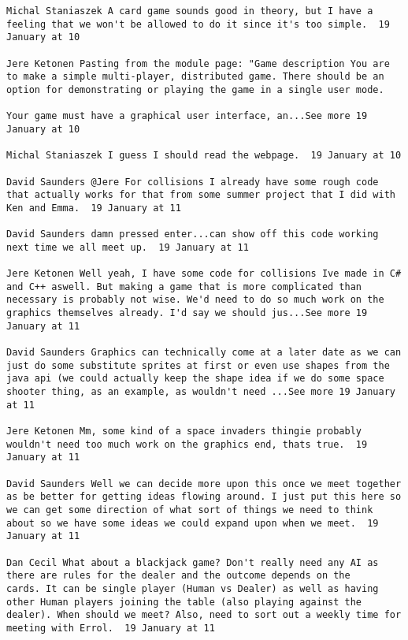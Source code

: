 \documentclass[10pt]{report}
\begin{document}
\begin{verbatim}
Michal Staniaszek A card game sounds good in theory, but I have a
feeling that we won't be allowed to do it since it's too simple.  19
January at 10

Jere Ketonen Pasting from the module page: "Game description You are
to make a simple multi-player, distributed game. There should be an
option for demonstrating or playing the game in a single user mode.

Your game must have a graphical user interface, an...See more 19
January at 10

Michal Staniaszek I guess I should read the webpage.  19 January at 10

David Saunders ‎@Jere For collisions I already have some rough code
that actually works for that from some summer project that I did with
Ken and Emma.  19 January at 11

David Saunders damn pressed enter...can show off this code working
next time we all meet up.  19 January at 11

Jere Ketonen Well yeah, I have some code for collisions Ive made in C#
and C++ aswell. But making a game that is more complicated than
necessary is probably not wise. We'd need to do so much work on the
graphics themselves already. I'd say we should jus...See more 19
January at 11

David Saunders Graphics can technically come at a later date as we can
just do some substitute sprites at first or even use shapes from the
java api (we could actually keep the shape idea if we do some space
shooter thing, as an example, as wouldn't need ...See more 19 January
at 11

Jere Ketonen Mm, some kind of a space invaders thingie probably
wouldn't need too much work on the graphics end, thats true.  19
January at 11

David Saunders Well we can decide more upon this once we meet together
as be better for getting ideas flowing around. I just put this here so
we can get some direction of what sort of things we need to think
about so we have some ideas we could expand upon when we meet.  19
January at 11

Dan Cecil What about a blackjack game? Don't really need any AI as
there are rules for the dealer and the outcome depends on the
cards. It can be single player (Human vs Dealer) as well as having
other Human players joining the table (also playing against the
dealer). When should we meet? Also, need to sort out a weekly time for
meeting with Errol.  19 January at 11


\end{verbatim}
\end{document}
